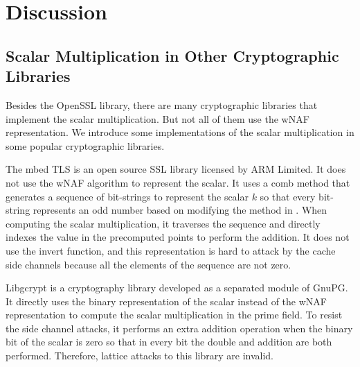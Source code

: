 \section{Discussion}
\label{sec:discussion}

\subsection{Scalar Multiplication in Other Cryptographic Libraries}
Besides the OpenSSL library, there are many cryptographic libraries that implement the scalar multiplication.
But not all of them use the wNAF representation.
We introduce some implementations of the scalar multiplication in some popular cryptographic libraries.

The mbed TLS \cite{polarssl} is an open source SSL library licensed by ARM Limited.
It does not use the wNAF algorithm to represent the scalar.
It uses a comb method that generates a sequence of bit-strings to represent the scalar $k$ so that every bit-string represents an odd number based on modifying the method in \cite{Hedabou2004ACM}.
When computing the scalar multiplication, it traverses the sequence and directly indexes the value in the precomputed points to perform the addition.
It does not use the invert function,
and this representation is hard to attack by the cache side channels because all the elements of the sequence are not zero.

Libgcrypt \cite{libgcrypt} is a cryptography library developed as a separated module of GnuPG.
It directly uses the binary representation of the scalar instead of the wNAF representation to compute the scalar multiplication in the prime field.
To resist the side channel attacks, it performs an extra addition operation when the binary bit of the scalar is zero so that in every bit the double and addition are both performed.
Therefore, lattice attacks to this library are invalid.


